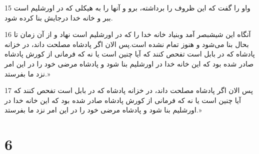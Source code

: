 \par 15 واو را گفت که این ظروف را برداشته، برو و آنها را به هیکلی که در اورشلیم است ببر و خانه خدا درجایش بنا کرده شود.
\par 16 آنگاه این شیشبصر آمد وبنیاد خانه خدا را که در اورشلیم است نهاد و از آن زمان تا بحال بنا می‌شود و هنوز تمام نشده است.پس الان اگر پادشاه مصلحت داند، در خزانه پادشاه که در بابل است تفحص کنند که آیا چنین است یا نه که فرمانی از کورش پادشاه صادر شده بود که این خانه خدا در اورشلیم بنا شود و پادشاه مرضی خود را در این امر نزد ما بفرستد.»
\par 17 پس الان اگر پادشاه مصلحت داند، در خزانه پادشاه که در بابل است تفحص کنند که آیا چنین است یا نه که فرمانی از کورش پادشاه صادر شده بود که این خانه خدا در اورشلیم بنا شود و پادشاه مرضی خود را در این امر نزد ما بفرستد.»
 
\chapter{6}

